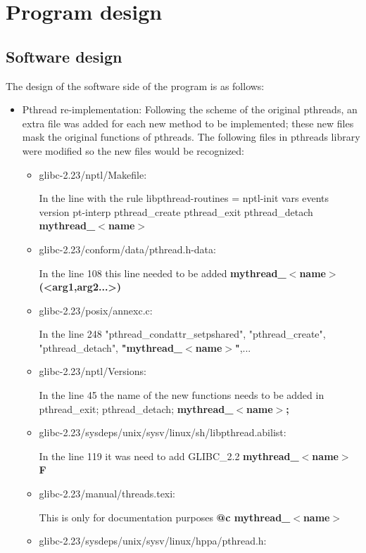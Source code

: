 \documentclass[a4paper,9pt]{article}
\begin{document}
\section{Program design}

\subsection{Software design}
The design of the software side of the program is as follows:
\begin{itemize}
\item Pthread re-implementation: Following the scheme of the original pthreads, an extra file was added for each new method to be implemented; these new files mask the original functions of pthreads. The following files in pthreads library were modified so the new files would be recognized:
\begin{itemize}
\item glibc-2.23/nptl/Makefile: 

In the line  with the rule libpthread-routines = nptl-init vars events version pt-interp pthread\_create pthread\_exit pthread\_detach \textbf{mythread\_$<$name$>$}

\item glibc-2.23/conform/data/pthread.h-data: 

In the line 108 this line needed to be added \textbf{mythread\_$<$name$>$(<arg1,arg2...>)}

\item glibc-2.23/posix/annexc.c: 

In the line 248 "pthread\_condattr\_setpshared", "pthread\_create", "pthread\_detach", \textbf{"mythread\_$<$name$>$"},...

\item glibc-2.23/nptl/Versions: 

In the line 45 the name of the new functions needs to be added in pthread\_exit; pthread\_detach; \textbf{mythread\_$<$name$>$;}

\item glibc-2.23/sysdeps/unix/sysv/linux/sh/libpthread.abilist: 

In the line 119 it was need to add GLIBC\_2.2 \textbf{mythread\_$<$name$>$ F}


\item glibc-2.23/manual/threads.texi:

This is only for documentation purposes \textbf{@c mythread\_$<$name$>$}

\item glibc-2.23/sysdeps/unix/sysv/linux/hppa/pthread.h:


\end{itemize}
\end{itemize}
\end{document}
